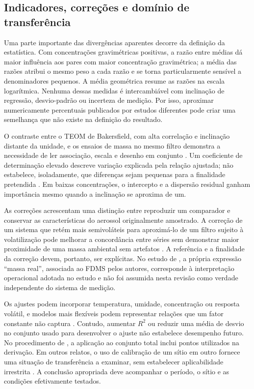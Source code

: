 \subsection{Indicadores, correções e domínio de transferência}

Uma parte importante das divergências aparentes decorre da definição da estatística. Com concentrações gravimétricas positivas, a razão entre médias dá maior influência aos pares com maior concentração gravimétrica; a média das razões atribui o mesmo peso a cada razão e se torna particularmente sensível a denominadores pequenos. A média geométrica resume as razões na escala logarítmica. Nenhuma dessas medidas é intercambiável com inclinação de regressão, desvio-padrão ou incerteza de medição. Por isso, aproximar numericamente percentuais publicados por estudos diferentes pode criar uma semelhança que não existe na definição do resultado.

O contraste entre o TEOM de Bakersfield, com alta correlação e inclinação distante da unidade, e os ensaios de massa no mesmo filtro demonstra a necessidade de ler associação, escala e desenho em conjunto \parencite{rsl129,rsl214}. Um coeficiente de determinação elevado descreve variação explicada pela relação ajustada; não estabelece, isoladamente, que diferenças sejam pequenas para a finalidade pretendida \parencite{bland1986}. Em baixas concentrações, o intercepto e a dispersão residual ganham importância mesmo quando a inclinação se aproxima de um.

As correções acrescentam uma distinção entre reproduzir um comparador e conservar as características do aerossol originalmente amostrado. A correção de um sistema que retém mais semivoláteis para aproximá-lo de um filtro sujeito à volatilização pode melhorar a concordância entre séries sem demonstrar maior proximidade de uma massa ambiental sem artefatos \parencite{rsl101,rsl085}. A referência e a finalidade da correção devem, portanto, ser explícitas. No estudo de \textcite{rsl085}, a própria expressão \enquote{massa real}, associada ao FDMS pelos autores, corresponde à interpretação operacional adotada no estudo e não foi assumida nesta revisão como verdade independente do sistema de medição.

Os ajustes podem incorporar temperatura, umidade, concentração ou resposta volátil, e modelos mais flexíveis podem representar relações que um fator constante não captura \parencite{rsl024,rsl029,rsl061,rsl219}. Contudo, aumentar $R^2$ ou reduzir uma média de desvio no conjunto usado para desenvolver o ajuste não estabelece desempenho futuro. No procedimento de \textcite{rsl085}, a aplicação ao conjunto total inclui pontos utilizados na derivação. Em outros relatos, o uso de calibração de um sítio em outro fornece uma situação de transferência a examinar, sem estabelecer aplicabilidade irrestrita \parencite{rsl342}. A conclusão apropriada deve acompanhar o período, o sítio e as condições efetivamente testados.

